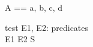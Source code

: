 \documentclass{llncs}
\begin{document}
\begin{zed}
A == \langle a, b, c, d  \rangle
\end{zed}
\begin{schema}{test}
E1, E2: predicates\\
\ST E1 \land E2  \in S
\end{schema}
\end{document}
